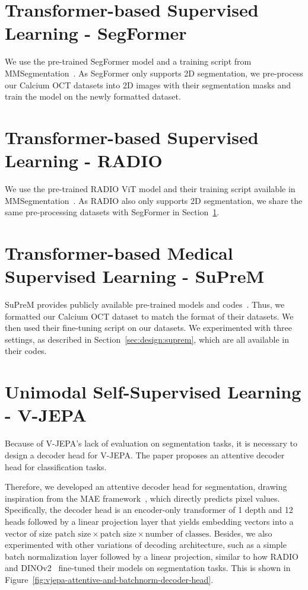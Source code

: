 \documentclass[a4paper,11pt,oneside]{report}
\begin{document}
\section{Transformer-based Supervised Learning - SegFormer}\label{sec:implementation:segformer}
We use the pre-trained SegFormer model and a training script from MMSegmentation~\cite{mmseg2020}. As SegFormer only supports 2D segmentation, we pre-process our Calcium OCT datasets into 2D images with their segmentation masks and train the model on the newly formatted dataset.

\section{Transformer-based Supervised Learning - RADIO}
We use the pre-trained RADIO ViT model and their training script available in MMSegmentation~\cite{mmseg2020}. As RADIO also only supports 2D segmentation, we share the same pre-processing datasets with SegFormer in Section~\ref{sec:implementation:segformer}.

\section{Transformer-based Medical Supervised Learning - SuPreM}
SuPreM provides publicly available pre-trained models and codes~\cite{Li2024}. Thus, we formatted our Calcium OCT dataset to match the format of their datasets. We then used their fine-tuning script on our datasets. We experimented with three settings, as described in Section~\ref{sec:design:suprem}, which are all available in their codes.

\section{Unimodal Self-Supervised Learning - V-JEPA}\label{sec:implementation:vjepa}
Because of V-JEPA's lack of evaluation on segmentation tasks, it is necessary to design a decoder head for V-JEPA. The paper proposes an attentive decoder head for classification tasks. 

Therefore, we developed an attentive decoder head for segmentation, drawing inspiration from the MAE framework~\cite{He2022}, which directly predicts pixel values. Specifically, the decoder head is an encoder-only transformer of 1 depth and 12 heads followed by a linear projection layer that yields embedding vectors into a vector of size \(\text{patch size} \times \text{patch size} \times \text{number of classes}\). Besides, we also experimented with other variations of decoding architecture, such as a simple batch normalization layer followed by a linear projection, similar to how RADIO~\cite{Ranzinger2024RADIO} and DINOv2~\cite{Oquab2024dinov} fine-tuned their models on segmentation tasks. This is shown in Figure~\ref{fig:vjepa-attentive-and-batchnorm-decoder-head}. 
\end{document}
